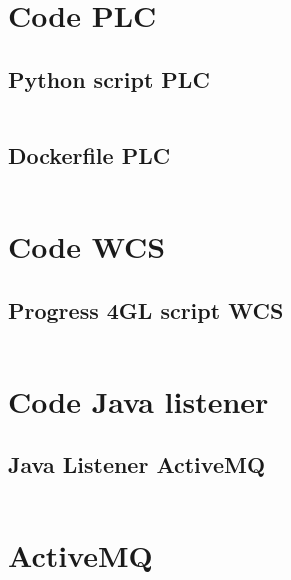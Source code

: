 
\section{Code PLC}\label{sec:code_plc}

\subsection{Python script PLC} \label{sec:script_plc}
\inputminted{python3}{../tests/plc/plc-simulator.py}
\newpage

\subsection{Dockerfile PLC} \label{sec:docker_plc}
\inputminted{python3}{../tests/plc/Dockerfile}

\section{Code WCS}\label{sec:code_wcs}

\subsection{Progress 4GL script WCS} \label{sec:script_wcs}
\inputminted{python3}{../tests/wcs/wcs.p}

\section{Code Java listener}\label{sec:code_java_listener} 

\subsection{Java Listener ActiveMQ}\label{sec:listener_activemq}
\inputminted{java}{../tests/listener/activemq-listener/demo/src/main/java/com/example/ActiveMQSocketBridge.java}

\section{ActiveMQ}
